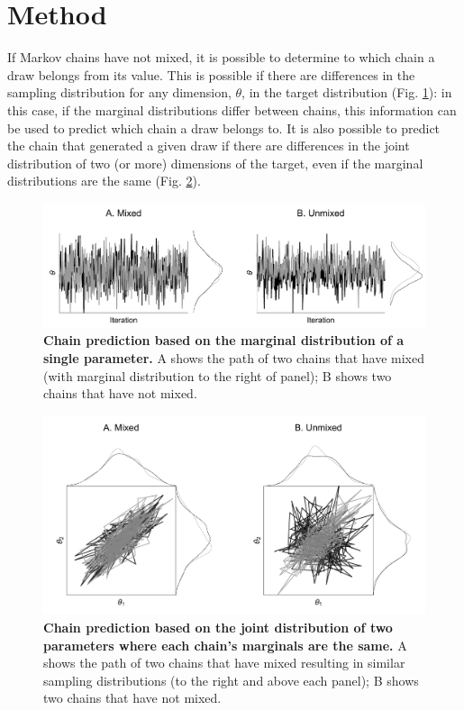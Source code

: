 \documentclass{article}
\begin{document}
\section{Method}\label{sec:method}
If Markov chains have not mixed, it is possible to determine to which chain a draw belongs from its value. This is possible if there are differences in the sampling distribution for any dimension, $\theta$, in the target distribution (Fig. \ref{fig:marginal}): in this case, if the marginal distributions differ between chains, this information can be used to predict which chain a draw belongs to. It  is also possible to predict the chain that generated a given draw if there are differences in the joint distribution of two (or more) dimensions of the target, even if the marginal distributions are the same (Fig. \ref{fig:joint}).

\begin{figure}[!htb]
	\centerline{\includegraphics[width=1.0\textwidth]{../output/unmixed_1.pdf}}
	\caption{\textbf{Chain prediction based on the marginal distribution of a single parameter.} A shows the path of two chains that have mixed (with marginal distribution to the right of panel); B shows two chains that have not mixed.}
	\label{fig:marginal}
\end{figure}

\begin{figure}[h]
	\centerline{\includegraphics[width=1.0\textwidth]{../output/unmixed_2.pdf}}
	\caption{\textbf{Chain prediction based on the joint distribution of two parameters where each chain's marginals are the same.} A shows the path of two chains that have mixed resulting in similar sampling distributions (to the right and above each panel); B shows two chains that have not mixed.}
	\label{fig:joint}
\end{figure}
\end{document}
